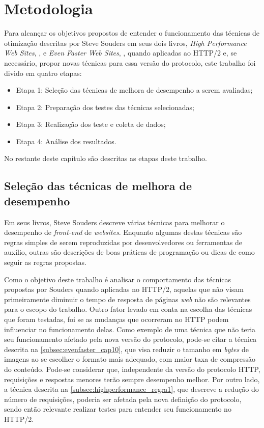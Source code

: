 %
%

\chapter{Metodologia}
\label{chap:metodologia}

Para alcançar os objetivos propostos de entender o funcionamento das técnicas de otimização descritas por Steve Souders em seus dois livros, \textit{High Performance Web Sites}, \cite{HighPerformance}, e \textit{Even Faster Web Sites}, \cite{EvenFaster}, quando aplicadas ao HTTP/2 e, se necessário, propor novas técnicas para essa versão do protocolo, este trabalho foi divido em quatro etapas:

\begin{itemize}
	\item Etapa 1: Seleção das técnicas de melhora de desempenho a serem avaliadas;
	\item Etapa 2: Preparação dos testes das técnicas selecionadas;
	\item Etapa 3: Realização dos teste e coleta de dados;
	\item Etapa 4: Análise dos resultados.
\end{itemize}

No restante deste capítulo são descritas as etapas deste trabalho.

\section{Seleção das técnicas de melhora de desempenho}
\label{sec:selecaodastecnicasdemelhoradedesempenho}

Em seus livros, Steve Souders descreve várias técnicas para melhorar o desempenho de \textit{front-end} de \textit{websites}. Enquanto algumas destas técnicas são regras simples de serem reproduzidas por desenvolvedores ou ferramentas de auxílio, outras são descrições de boas práticas de programação ou dicas de como seguir as regras propostas.

Como o objetivo deste trabalho é analisar o comportamento das técnicas propostas por Souders quando aplicadas no HTTP/2, aquelas que não visam primeiramente diminuir o tempo de resposta de páginas \textit{web} não são relevantes para o escopo do trabalho. Outro fator levado em conta na escolha das técnicas que foram testadas, foi se as mudanças que ocorreram no HTTP podem influenciar no funcionamento delas. Como exemplo de uma técnica que não teria seu funcionamento afetado pela nova versão do protocolo, pode-se citar a técnica descrita na \autoref{subsec:evenfaster_cap10}, que visa reduzir o tamanho em \textit{bytes} de imagens ao se escolher o formato mais adequado, com maior taxa de compressão do conteúdo. Pode-se considerar que, independente da versão do protocolo HTTP, requisições e respostas menores terão sempre desempenho melhor. Por outro lado, a técnica descrita na \autoref{subsec:highperformance_regra1}, que descreve a redução do número de requisições, poderia ser afetada pela nova definição do protocolo, sendo então relevante realizar testes para entender seu funcionamento no HTTP/2.

